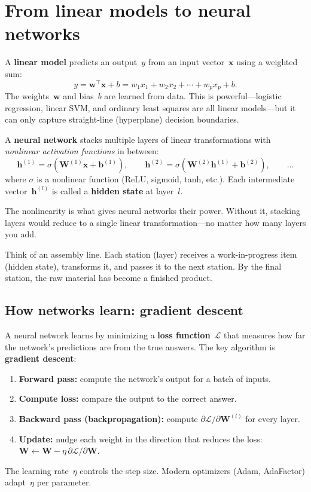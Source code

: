 \documentclass[11pt, twoside, openright]{memoir}
\begin{document}
\section{From linear models to neural networks}

A \textbf{linear model} predicts an output~$y$ from an input vector~$\mathbf{x}$
using a weighted sum:
\[
  y = \mathbf{w}^\top \mathbf{x} + b
  = w_1 x_1 + w_2 x_2 + \cdots + w_p x_p + b.
\]
The weights~$\mathbf{w}$ and bias~$b$ are learned from data.  This is
powerful---logistic regression, linear SVM, and ordinary least squares are
all linear models---but it can only capture straight-line (hyperplane)
decision boundaries.

A \textbf{neural network} stacks multiple layers of linear transformations
with \emph{nonlinear activation functions} in between:
\[
  \mathbf{h}^{(1)} = \sigma(\mathbf{W}^{(1)} \mathbf{x} + \mathbf{b}^{(1)}),
  \qquad
  \mathbf{h}^{(2)} = \sigma(\mathbf{W}^{(2)} \mathbf{h}^{(1)} + \mathbf{b}^{(2)}),
  \qquad \ldots
\]
where $\sigma$ is a nonlinear function (ReLU, sigmoid, tanh, etc.).  Each
intermediate vector~$\mathbf{h}^{(l)}$ is called a \textbf{hidden state}
at layer~$l$.

\begin{keyidea}
The nonlinearity is what gives neural networks their power.  Without it,
stacking layers would reduce to a single linear transformation---no matter
how many layers you add.
\end{keyidea}

\begin{analogy}
Think of an assembly line.  Each station (layer) receives a work-in-progress
item (hidden state), transforms it, and passes it to the next station.
By the final station, the raw material has become a finished product.
\end{analogy}

\subsection{How networks learn: gradient descent}

A neural network learns by minimizing a \textbf{loss function}~$\mathcal{L}$
that measures how far the network's predictions are from the true answers.
The key algorithm is \textbf{gradient descent}:
\begin{enumerate}[nosep]
\item \textbf{Forward pass:} compute the network's output for a batch of inputs.
\item \textbf{Compute loss:} compare the output to the correct answer.
\item \textbf{Backward pass (backpropagation):} compute
  $\partial \mathcal{L} / \partial \mathbf{W}^{(l)}$ for every layer.
\item \textbf{Update:} nudge each weight in the direction that reduces the loss:
  $\mathbf{W} \leftarrow \mathbf{W} - \eta \, \partial \mathcal{L} / \partial \mathbf{W}$.
\end{enumerate}
The learning rate~$\eta$ controls the step size.  Modern optimizers (Adam,
AdaFactor) adapt~$\eta$ per parameter.
\end{document}
